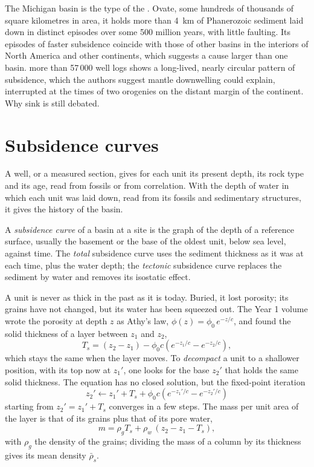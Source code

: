 The Michigan basin is the type of the . Ovate, some hundreds of thousands
of square kilometres in area, it holds more than \qty{4}{km} of Phanerozoic sediment laid down
in distinct episodes over some 500 million years, with little faulting. Its episodes of faster
subsidence coincide with those of other basins in the interiors of North America and other
continents, which suggests a cause larger than one basin.  more than 57\,000
well logs shows a long-lived, nearly circular pattern of subsidence, which the authors suggest
mantle downwelling could explain, interrupted at the times of two orogenies on the distant
margin of the continent. Why  sink is still debated.

\section{Subsidence curves}\label{sec:b2:basins-compared:curves}

A well, or a measured section, gives for each unit its present depth, its rock type and its age,
read from fossils or from correlation. With the depth of water in which each unit was laid
down, read from its fossils and sedimentary structures, it gives the history of the basin.

\begin{definition}\label{def:b2:basins-compared:curve}
A \emph{subsidence curve} of a basin at a site is the graph of the depth
of a reference surface, usually the basement or the base of the oldest unit, below sea level,
against time. The \emph{total} subsidence curve uses the sediment thickness as it was at each
time, plus the water depth; the \emph{tectonic} subsidence curve replaces the sediment by water
and removes its isostatic effect.
\end{definition}

A unit is never as thick in the past as it is today. Buried, it lost porosity; its grains have
not changed, but its water has been squeezed out. The Year 1 volume wrote the porosity at depth
$z$ as Athy's law, $\phi(z) = \phi_0\,e^{-z/c}$, and found the solid thickness of a layer between
$z_1$ and $z_2$,
\[
  T_s = (z_2 - z_1) - \phi_0 c\left(e^{-z_1/c} - e^{-z_2/c}\right),
\]
which stays the same when the layer moves. To \emph{decompact} a unit to a shallower position,
with its top now at $z_1'$, one looks for the base $z_2'$ that holds the same solid thickness. The
equation has no closed solution, but the fixed-point iteration
\[
  z_2' \leftarrow z_1' + T_s + \phi_0 c\left(e^{-z_1'/c} - e^{-z_2'/c}\right)
\]
starting from $z_2' = z_1' + T_s$ converges in a few steps. The mass per unit area of the layer
is that of its grains plus that of its pore water,
\[
  m = \rho_g T_s + \rho_w\,(z_2 - z_1 - T_s),
\]
with $\rho_g$ the density of the grains; dividing the mass of a column by its thickness gives
its mean density $\bar\rho_s$.

